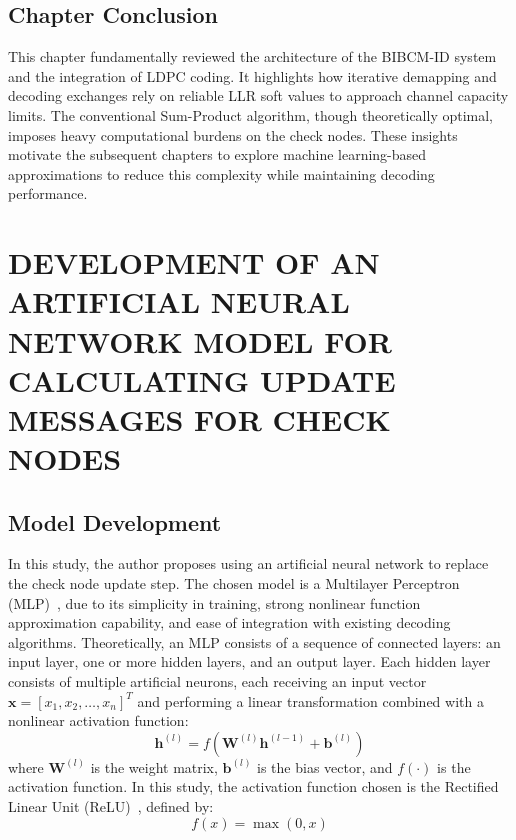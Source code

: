 \documentclass[a4paper,14pt]{extreport}
\begin{document}
\section{Chapter Conclusion}
This chapter fundamentally reviewed the architecture of the BIBCM-ID system and the integration of LDPC coding. It highlights how iterative demapping and decoding exchanges rely on reliable LLR soft values to approach channel capacity limits. The conventional Sum-Product algorithm, though theoretically optimal, imposes heavy computational burdens on the check nodes. These insights motivate the subsequent chapters to explore machine learning-based approximations to reduce this complexity while maintaining decoding performance.


\chapter{DEVELOPMENT OF AN ARTIFICIAL NEURAL NETWORK MODEL FOR CALCULATING UPDATE MESSAGES FOR CHECK NODES}

\section{Model Development}

In this study, the author proposes using an artificial neural network to replace the check node update step. The chosen model is a Multilayer Perceptron (MLP)~\cite{ref9}, due to its simplicity in training, strong nonlinear function approximation capability, and ease of integration with existing decoding algorithms. Theoretically, an MLP consists of a sequence of connected layers: an input layer, one or more hidden layers, and an output layer. Each hidden layer consists of multiple artificial neurons, each receiving an input vector $\mathbf{x} = [x_1, x_2, \ldots, x_n]^T$ and performing a linear transformation combined with a nonlinear activation function:
\begin{equation}
    \mathbf{h}^{(l)} = f\left(\mathbf{W}^{(l)} \mathbf{h}^{(l-1)} + \mathbf{b}^{(l)}\right)
    \label{eq:mlp}
\end{equation}
where $\mathbf{W}^{(l)}$ is the weight matrix, $\mathbf{b}^{(l)}$ is the bias vector, and $f(\cdot)$ is the activation function. In this study, the activation function chosen is the Rectified Linear Unit (ReLU)~\cite{ref10}, defined by:
\begin{equation}
    f(x) = \max(0, x)
    \label{eq:relu}
\end{equation}
\end{document}
